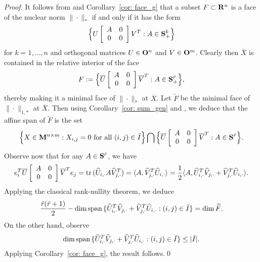 \documentclass[smallextended,numbook]{svjour3}
\begin{document}
\begin{proof}
It follows from \cite[Example~5.6]{Sa_ball} and Corollary~\ref{cor: face_g} that a subset $F\subset{{\bf R}}^n$ is a face of the nuclear norm $\|\cdot\|_{*}$ if and only if it has the form
\[\Big\{U\left[ \begin{array}{cc}
A & 0 \\
0 & 0 
\end{array} \right] V^T: A\in {\bf S}^{k}_{+}\Big\}\] 
for $k=1,\ldots, n$ and orthogonal matrices $U\in {\bf O}^{n}$ and $V\in {\bf O}^m$. 
Clearly then $\overline{X}$ is contained in the relative interior of the face 
\[F:= \Big\{ \overline{U}\left[ \begin{array}{cc}
A & 0 \\
0 & 0 
\end{array} \right] \overline{V}^T: A\in {\bf S}^{\bar{r}}_{+}\Big\},\]
thereby making it a minimal face of $\|\cdot\|_{*}$ at $\overline{X}$. Let $\widetilde{F}$ be the minimal face of 
$\|\cdot\|_{1,*}$ at $\overline{X}$.
Then using Corollary~\ref{cor: sum_gen} and \cite[Theorem~6.5]{con_ter}, we deduce
that the affine span of $\widetilde{F}$ is the set
\[\Big\{X\in {\bf M}^{n\times m}: X_{i,j}=0 \textrm{ for all } (i,j)\in \bar{I}\Big\} \bigcap \Big\{ \overline{U}\left[ \begin{array}{cc}
A & 0 \\
0 & 0 
\end{array} \right] \overline{V}^T: A\in {\bf S}^{\bar{r}}\Big\}.\] 
Observe now that for any $A\in {\bf S}^{\bar{r}}$, we have
$$e_i^{T}\overline{U}\left[ \begin{array}{cc}
A & 0 \\
0 & 0 
\end{array} \right] \overline{V}^T e_j={\mbox{\rm tr}\,}(\widehat{U}_{i,\cdot} A \widehat{V}^T_{j,\cdot})=\langle A, \widehat{V}^T_{j,\cdot}\widehat{U}_{i,\cdot} \rangle = \frac{1}{2}\langle A, \widehat{U}^T_{i,\cdot}\widehat{V}_{j,\cdot}+\widehat{V}^T_{j,\cdot}\widehat{U}_{i,\cdot} \rangle.$$
Applying the classical rank-nullity theorem, we deduce
$$\frac{\bar{r}(\bar{r}+1)}{2}- \dim{\mbox{\rm span}\,} \{ \widehat{U}^T_{i,\cdot}\widehat{V}_{j,\cdot}+\widehat{V}^T_{j,\cdot}\widehat{U}_{i,\cdot}  : (i,j)\in\bar{I}\}  = \dim \widetilde{F}.$$
On the other hand, observe 
$$\dim{\mbox{\rm span}\,} \{ \widehat{U}^T_{i,\cdot}\widehat{V}_{j,\cdot}+\widehat{V}^T_{j,\cdot}\widehat{U}_{i,\cdot}  : (i,j)\in\bar{I}\} \leq |\bar{I}| .$$
Applying Corollary~\ref{cor: face_g}, the result follows.\qed
\end{proof}
\end{document}
